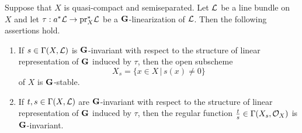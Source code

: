 \begin{proposition}\label{proposition:representation_on_global_sections_of_line_bundle_properties}
Suppose that $X$ is quasi-compact and semiseparated. Let ${\mathcal L}$ be a line bundle on $X$ and let $\tau:a^*{\mathcal L}\rightarrow \mathrm{pr}_X^*{\mathcal L}$ be a $\mathbf{G}$-linearization of ${\mathcal L}$. Then the following assertions hold.
\begin{enumerate}[label=\emph{\textbf{(\arabic*)}}, leftmargin=3.0em]
\item If $s\in \Gamma(X,{\mathcal L})$ is $\mathbf{G}$-invariant with respect to the structure of linear representation of $\mathbf{G}$ induced by $\tau$, then the open subscheme 
$$X_s = \big\{x\in  X\,\big|\,s(x)\neq 0\big\}$$
of $X$ is $\mathbf{G}$-stable.
\item If $t,s\in \Gamma(X,{\mathcal L})$ are $\mathbf{G}$-invariant with respect to the structure of linear representation of $\mathbf{G}$ induced by $\tau$, then the regular function $\frac{t}{s}\in \Gamma(X_s,{\mathcal O}_X)$ is $\mathbf{G}$-invariant.
\end{enumerate}
\end{proposition}
